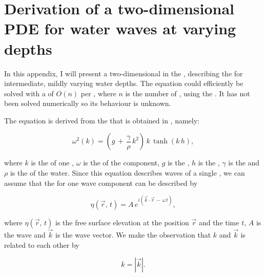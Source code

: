 \chapter{Derivation of a two-dimensional PDE for water waves at varying depths}

In this appendix, I will present a two-dimensional \PDE in the , describing the  for intermediate, mildly varying water depths. The equation could efficiently be solved with a  of $O(n)$ per , where $n$ is the number of , using the \CFMM \citep{White1994}. It has not been solved numerically so its behaviour is unknown.

The equation is derived from the  that is obtained in , namely:

\begin{equation} \label{eq:dispersion}
\omega^2(k) = \left(g\,+\,\frac{\gamma}{\rho}\,k^2\right)\,k\,\tanh(k\,h),
\end{equation}

where $k$ is the  of one , $\omega$ is the  of the component, $g$ is the , $h$ is the , $\gamma$ is the  and $\rho$ is the  of the water. Since this equation describes waves of a single , we can assume that the  for one wave component can be described by

\begin{equation} \label{eq:component}
\eta(\vec{r},\,t) = A\,e^{i(\vec{k}\cdot\vec{r}\,-\,\omega\,t)},
\end{equation}

where $\eta(\vec{r},\,t)$ is the free surface elevation at the position $\vec{r}$ and the time $t$, $A$ is the wave  and $\vec{k}$ is the wave vector. We make the observation that $k$ and $\vec{k}$ is related to each other by

\begin{equation} \label{eq:kvectok}
k = \left|\vec{k}\right|.
\end{equation}

